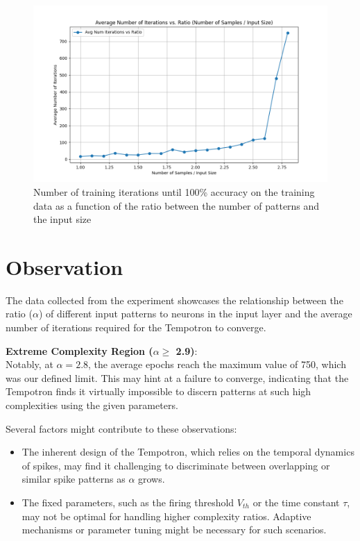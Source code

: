 \begin{figure}[H]
    \centering
    \includegraphics[width=0.8\linewidth]{results/graphs/alpha-validation.png}
    \caption{Number of training iterations until 100\% accuracy on the training data as a function of the ratio between the number of patterns and the input size}
    \label{fig:alpha-validation}
\end{figure}


\section{Observation}

The data collected from the experiment showcases the relationship between the ratio (\( \alpha \)) of different input patterns to neurons in the input layer and the average number of iterations required for the Tempotron to converge.

\textbf{Extreme Complexity Region (\( \alpha \geq\) 2.9)}: \\
Notably, at \( \alpha = 2.8 \), the average epochs reach the maximum value of 750, which was our defined limit. This may hint at a failure to converge, indicating that the Tempotron finds it virtually impossible to discern patterns at such high complexities using the given parameters.

Several factors might contribute to these observations:

\begin{itemize}
    \item The inherent design of the Tempotron, which relies on the temporal dynamics of spikes, may find it challenging to discriminate between overlapping or similar spike patterns as \( \alpha \) grows.
    
    \item The fixed parameters, such as the firing threshold \( V_{th} \) or the time constant \( \tau \), may not be optimal for handling higher complexity ratios. Adaptive mechanisms or parameter tuning might be necessary for such scenarios.
    
\end{itemize}

